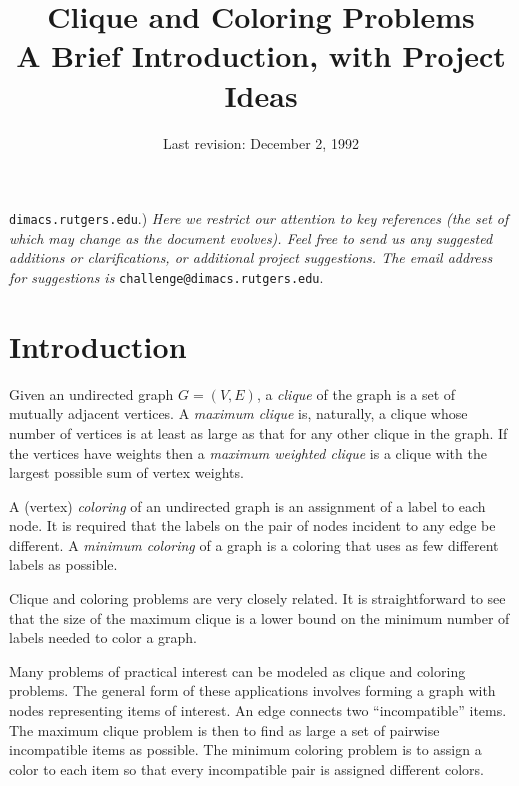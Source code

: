 %
%
\title{Clique and Coloring Problems\\A Brief Introduction, with Project Ideas}
\author{}
\date{Last revision: December 2, 1992}

\maketitle 

{ {\tt dimacs.rutgers.edu}.)  {\it Here we restrict our
    attention to key references (the set of which may change as the
    document evolves).  Feel free to send us any suggested additions
    or clarifications, or additional project suggestions.  The email
    address for suggestions is} {\tt challenge@dimacs.rutgers.edu}.}

\section{Introduction}

Given an undirected graph $G = (V,E)$, a {\it clique} of the graph is a set of
mutually adjacent vertices.  A {\it maximum clique} is, naturally, a
clique whose number of vertices is at least as large as that for any
other clique in the graph.  If the vertices have weights then a {\it
maximum weighted clique} is a clique with the largest possible sum of vertex
weights.

A (vertex) {\it coloring} of an undirected graph is an assignment of a
label to each node.  It is required that the labels on the pair of
nodes incident to any edge be different.  A {\it minimum coloring} of
a graph is a coloring that uses as few different labels as possible.

Clique and coloring problems are very closely related.  It is
straightforward to see that the size of the maximum clique is a lower
bound on the minimum number of labels needed to color a graph.  

Many problems of practical interest can be modeled as clique and
coloring problems.  The general form of these applications involves
forming a graph with nodes representing items of interest.  An edge
connects two ``incompatible'' items.  The maximum clique problem is then
to find as large a set of pairwise incompatible items as possible.  The
minimum coloring problem is to assign a color to each item so that
every incompatible pair is assigned different colors.

